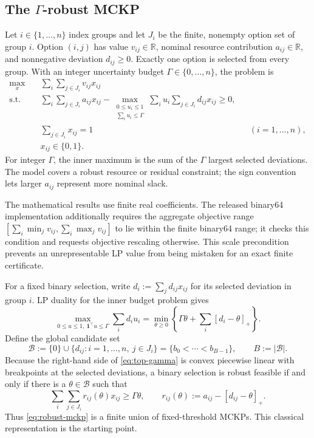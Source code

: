 \documentclass[11pt]{article}
\theoremstyle{plain}
\theoremstyle{definition}
\theoremstyle{remark}
\newcommand{\R}{\mathbb R}
\newcommand{\B}{\mathcal B}
\newcommand{\pos}[1]{[#1]_+}
\begin{document}
\subsection{The \texorpdfstring{$\Gamma$}{Gamma}-robust MCKP}

Let $i\in\{1,\ldots,n\}$ index groups and let $J_i$ be the finite, nonempty option set of group $i$.  Option $(i,j)$ has value $v_{ij}\in\R$, nominal resource contribution $a_{ij}\in\R$, and nonnegative deviation $d_{ij}\ge0$.  Exactly one option is selected from every group.  With an integer uncertainty budget $\Gamma\in\{0,\ldots,n\}$, the problem is
\begin{align}
\max_x\quad & \sum_i\sum_{j\in J_i}v_{ij}x_{ij} \label{eq:robust-mckp}\tag{R-MCKP}\\
\text{s.t.}\quad &
\sum_i\sum_{j\in J_i}a_{ij}x_{ij}
-\max_{\substack{0\le u_i\le1\\\sum_i u_i\le\Gamma}}
\sum_i u_i\sum_{j\in J_i}d_{ij}x_{ij}\ge0,\nonumber\\
&\sum_{j\in J_i}x_{ij}=1 &&(i=1,\ldots,n),\nonumber\\
&x_{ij}\in\{0,1\}.\nonumber
\end{align}
For integer $\Gamma$, the inner maximum is the sum of the $\Gamma$ largest selected deviations.  The model covers a robust resource or residual constraint; the sign convention lets larger $a_{ij}$ represent more nominal slack.

The mathematical results use finite real coefficients.  The released binary64 implementation additionally requires the aggregate objective range $[\sum_i\min_j v_{ij},\sum_i\max_j v_{ij}]$ to lie within the finite binary64 range; it checks this condition and requests objective rescaling otherwise.  This scale precondition prevents an unrepresentable LP value from being mistaken for an exact finite certificate.

For a fixed binary selection, write $d_i:=\sum_jd_{ij}x_{ij}$ for its selected deviation in group $i$.  LP duality for the inner budget problem gives
\begin{equation}\label{eq:top-gamma}
\max_{0\le u\le1,\ \mathbf 1^\top u\le\Gamma}\sum_i d_i u_i
=\min_{\theta\ge0}\left\{\Gamma\theta+\sum_i\pos{d_i-\theta}\right\}.
\end{equation}
Define the global candidate set
\[
\B:=\{0\}\cup\{d_{ij}:i=1,\ldots,n,\ j\in J_i\}
=\{b_0<\cdots<b_{B-1}\},\qquad B:=|\B|.
\]
Because the right-hand side of \eqref{eq:top-gamma} is convex piecewise linear with breakpoints at the selected deviations, a binary selection is robust feasible if and only if there is a $\theta\in\B$ such that
\begin{equation}\label{eq:fixed-threshold-feasibility}
\sum_i\sum_{j\in J_i}r_{ij}(\theta)x_{ij}\ge\Gamma\theta,
\qquad
r_{ij}(\theta):=a_{ij}-\pos{d_{ij}-\theta}.
\end{equation}
Thus \eqref{eq:robust-mckp} is a finite union of fixed-threshold MCKPs.  This classical representation is the starting point.
\end{document}
